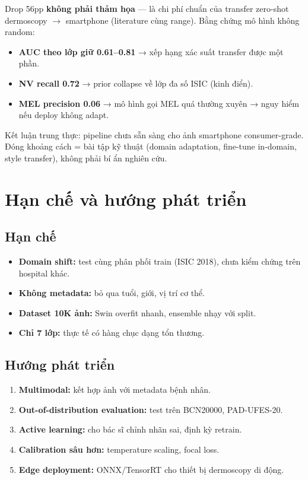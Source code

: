 \documentclass[11pt,a4paper]{article}
\begin{document}
\begin{idea}
Drop 56pp \textbf{không phải thảm họa} --- là chi phí chuẩn của transfer zero-shot dermoscopy $\rightarrow$ smartphone (literature cùng range). Bằng chứng mô hình không random:
\begin{itemize}[leftmargin=*]
  \item \textbf{AUC theo lớp giữ 0.61--0.81} → xếp hạng xác suất transfer được một phần.
  \item \textbf{NV recall 0.72} → prior collapse về lớp đa số ISIC (kinh điển).
  \item \textbf{MEL precision 0.06} → mô hình gọi MEL quá thường xuyên → nguy hiểm nếu deploy không adapt.
\end{itemize}
Kết luận trung thực: pipeline chưa sẵn sàng cho ảnh smartphone consumer-grade. Đóng khoảng cách = bài tập kỹ thuật (domain adaptation, fine-tune in-domain, style transfer), không phải bí ẩn nghiên cứu.
\end{idea}


\section{Hạn chế và hướng phát triển}

\subsection{Hạn chế}

\begin{itemize}[leftmargin=*]
  \item \textbf{Domain shift:} test cùng phân phối train (ISIC 2018), chưa kiểm chứng trên hospital khác.
  \item \textbf{Không metadata:} bỏ qua tuổi, giới, vị trí cơ thể.
  \item \textbf{Dataset 10K ảnh:} Swin overfit nhanh, ensemble nhạy với split.
  \item \textbf{Chỉ 7 lớp:} thực tế có hàng chục dạng tổn thương.
\end{itemize}

\subsection{Hướng phát triển}

\begin{enumerate}[leftmargin=*]
  \item \textbf{Multimodal:} kết hợp ảnh với metadata bệnh nhân.
  \item \textbf{Out-of-distribution evaluation:} test trên BCN20000, PAD-UFES-20.
  \item \textbf{Active learning:} cho bác sĩ chỉnh nhãn sai, định kỳ retrain.
  \item \textbf{Calibration sâu hơn:} temperature scaling, focal loss.
  \item \textbf{Edge deployment:} ONNX/TensorRT cho thiết bị dermoscopy di động.
\end{enumerate}
\end{document}
